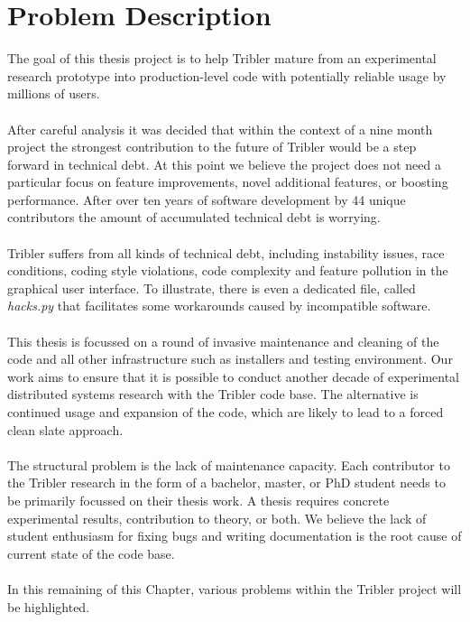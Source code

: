 \chapter{Problem Description}
\label{chapter:problem-description}
The goal of this thesis project is to help Tribler mature from an experimental research prototype into production-level code with potentially reliable usage by millions of users.\\\\
After careful analysis it was decided that within the context of a nine month project the strongest contribution to the future of Tribler would be a step forward in technical debt. At this point we believe the project does not need a particular focus on feature improvements, novel additional features, or boosting performance. After over ten years of software development by 44 unique contributors the amount of accumulated technical debt is worrying.\\\\
Tribler suffers from all kinds of technical debt, including instability issues, race conditions, coding style violations, code complexity and feature pollution in the graphical user interface. To illustrate, there is even a dedicated file, called \emph{hacks.py} that facilitates some workarounds caused by incompatible software.\\\\
This thesis is focussed on a round of invasive maintenance and cleaning of the code and all other infrastructure such as installers and testing environment. Our work aims to ensure that it is possible to conduct another decade of experimental distributed systems research with the Tribler code base. The alternative is continued usage and expansion of the code, which are likely to lead to a forced clean slate approach.\\\\
The structural problem is the lack of maintenance capacity. Each contributor to the Tribler research in the form of a bachelor, master, or PhD student needs to be primarily focussed on their thesis work. A thesis requires concrete experimental results, contribution to theory, or both. We believe the lack of student enthusiasm for fixing bugs and writing documentation is the root cause of current state of the code base.\\\\
In this remaining of this Chapter, various problems within the Tribler project will be highlighted.

